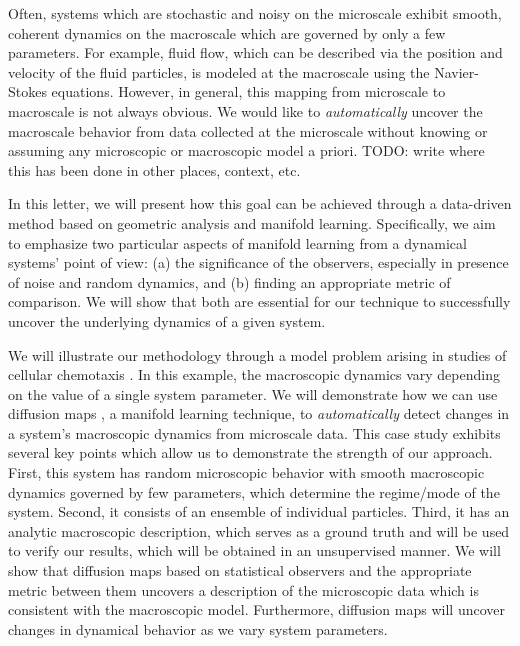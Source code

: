 \documentclass[prl, reprint, final, showkeys]{revtex4-1}
\begin{document}

\maketitle

 
Often, systems which are stochastic and noisy on the microscale exhibit smooth, coherent dynamics on the macroscale which are governed by only a few parameters.
%
For example, fluid flow, which can be described via the position and velocity of the fluid particles, is modeled at the macroscale using the Navier-Stokes equations.
%
However, in general, this mapping from microscale to macroscale is not always obvious.
%
We would like to {\em automatically} uncover the macroscale behavior from data collected at the microscale without knowing or assuming any microscopic or macroscopic model a priori.
%
TODO: write where this has been done in other places, context, etc.

In this letter, we will present how this goal can be achieved through a data-driven method based on geometric analysis and manifold learning. Specifically, we aim to emphasize two particular aspects of manifold learning from a dynamical systems' point of view: (a) the significance of the observers, especially in presence of noise and random dynamics, and (b) finding an appropriate metric of comparison. We will show that both are essential for our technique to successfully uncover the underlying dynamics of a given system.

We will illustrate our methodology through a model problem arising in studies of cellular chemotaxis \cite{othmer2000diffusion}.
%
In this example, the macroscopic dynamics vary depending on the value of a single system parameter.
%
We will demonstrate how we can use diffusion maps \cite{coifman2005geometric}, a manifold learning technique, to {\em automatically} detect changes in a system's macroscopic dynamics from microscale data.
%
This case study exhibits several key points which allow us to demonstrate the strength of our approach.
%
First, this system has random microscopic behavior with smooth macroscopic dynamics governed by few parameters, which determine the regime/mode of the system. 
%
Second, it consists of an ensemble of individual particles. 
%
Third, it has an analytic macroscopic description, which serves as a ground truth and will be used to verify our results, which will be obtained in an unsupervised manner.
%
We will show that diffusion maps based on statistical observers and the appropriate metric between them uncovers a description of the microscopic data which is consistent with the macroscopic model.
%
Furthermore, diffusion maps will uncover changes in dynamical behavior as we vary system parameters. 
\end{document}
